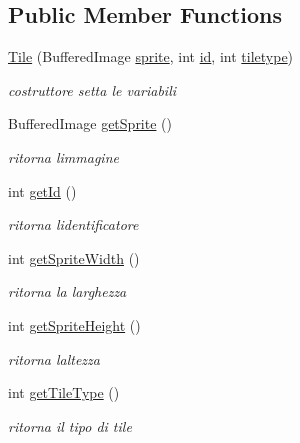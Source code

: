 \subsection*{Public Member Functions}
\begin{DoxyCompactItemize}
\item 
\hyperlink{classobjects_1_1_tile_acbf8ab43b0cee998ab5f07f76d55fdee}{Tile} (Buffered\+Image \hyperlink{classobjects_1_1_tile_a596d0c3eea54a08f78cbad0a4fbec565}{sprite}, int \hyperlink{classobjects_1_1_tile_a7441ef0865bcb3db9b8064dd7375c1ea}{id}, int \hyperlink{classobjects_1_1_tile_aa7bcd46686997f7cbef377c22eed1c8d}{tiletype})
\begin{DoxyCompactList}\small\item\em costruttore setta le variabili \end{DoxyCompactList}\item 
Buffered\+Image \hyperlink{classobjects_1_1_tile_ac51c0c8c26d79dc6df726b968276afb2}{get\+Sprite} ()
\begin{DoxyCompactList}\small\item\em ritorna l\textquotesingle{}immagine \end{DoxyCompactList}\item 
int \hyperlink{classobjects_1_1_tile_a67283be3f45257d1e0c474c563ebb6b6}{get\+Id} ()
\begin{DoxyCompactList}\small\item\em ritorna l\textquotesingle{}identificatore \end{DoxyCompactList}\item 
int \hyperlink{classobjects_1_1_tile_a57c0bcd3471b12679b57faa7ba32d91c}{get\+Sprite\+Width} ()
\begin{DoxyCompactList}\small\item\em ritorna la larghezza \end{DoxyCompactList}\item 
int \hyperlink{classobjects_1_1_tile_af71d2cd2060d5ecee3b0a8c387b981dd}{get\+Sprite\+Height} ()
\begin{DoxyCompactList}\small\item\em ritorna l\textquotesingle{}altezza \end{DoxyCompactList}\item 
int \hyperlink{classobjects_1_1_tile_a19996fc03739127aa64afbd2f49c2a7c}{get\+Tile\+Type} ()
\begin{DoxyCompactList}\small\item\em ritorna il tipo di tile \end{DoxyCompactList}\end{DoxyCompactItemize}
